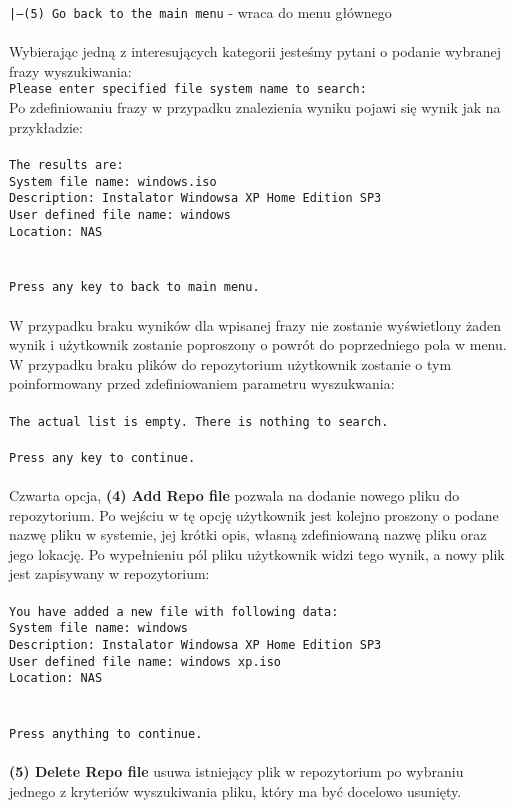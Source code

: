 \documentclass[10pt, a4paper]{article}
\begin{document}
\texttt{|---(5) Go back to the main menu} - wraca do menu głównego\\
\\
Wybierając jedną z interesujących kategorii jesteśmy pytani o podanie wybranej frazy wyszukiwania:\\
\texttt{Please enter specified file system name to search:}\\
Po zdefiniowaniu frazy w przypadku znalezienia wyniku pojawi się wynik jak na przykładzie:\\
\\
\texttt{The results are:\\
System file name: windows.iso\\
Description: Instalator Windowsa XP Home Edition SP3\\
User defined file name: windows\\
Location: NAS\\
\\
\\
Press any key to back to main menu.}\\
\\
W przypadku braku wyników dla wpisanej frazy nie zostanie wyświetlony żaden wynik i użytkownik zostanie poproszony o powrót do poprzedniego pola w menu. W przypadku braku plików do repozytorium użytkownik zostanie o tym poinformowany przed zdefiniowaniem parametru wyszukwania:\\
\\
\texttt{The actual list is empty. There is nothing to search.\\
\\
Press any key to continue.}\\
\\
Czwarta opcja, \textbf{(4) Add Repo file} pozwala na dodanie nowego pliku do repozytorium. Po wejściu w tę opcję użytkownik jest kolejno proszony o podane nazwę pliku w systemie, jej krótki opis, własną zdefiniowaną nazwę pliku oraz jego lokację. Po wypełnieniu pól pliku użytkownik widzi tego wynik, a nowy plik jest zapisywany w repozytorium:\\
\\
\texttt{You have added a new file with following data:\\
System file name: windows\\
Description: Instalator Windowsa XP Home Edition SP3\\
User defined file name: windows xp.iso\\
Location: NAS\\
\\
\\
Press anything to continue.}\\
\\
\textbf{(5) Delete Repo file} usuwa istniejący plik w repozytorium po wybraniu jednego z kryteriów wyszukiwania pliku, który ma być docelowo usunięty.
\end{document}
